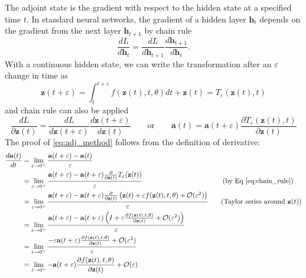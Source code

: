 \documentclass{article}
\renewcommand{\epsilon}{\varepsilon}
\newcommand\bigO{\mathcal{O}}
\newcommand{\va}{\mathbf{a}}
\newcommand{\vh}{\mathbf{h}}
\newcommand{\vz}{\mathbf{z}}
\newcommand{\hidden}{\vh}
\newcommand{\sol}{\vz}  %
\newcommand{\adj}{\va}
\begin{document}
\begin{appendices}
\noindent
The adjoint state is the gradient with respect to the hidden state at a specified time $t$. In standard neural networks, the gradient of a hidden layer $\hidden_t$ depends on the gradient from the next layer $\hidden_{t+1}$ by chain rule
\begin{equation}
\frac{d L}{d \hidden_t} = \frac{d L}{d \hidden_{t+1}} \frac{d \hidden_{t+1}}{d \hidden_{t}}.
\end{equation}
With a continuous hidden state, we can write the transformation after an $\epsilon$ change in time as
\begin{equation}
\sol(t+\epsilon) = \int_t^{t+\epsilon} f(\sol(t), t, \theta) dt + \sol(t) = T_\epsilon(\sol(t), t)
\end{equation}
and chain rule can also be applied
\begin{equation}\label{eq:chain_rule}
\frac{d L}{\partial \sol(t)} = \frac{d L}{d \sol(t+\epsilon)} \frac{d \sol(t+\epsilon)}{d \sol(t)} \quad\quad\text{or}\quad\quad \adj(t) = \adj(t+\epsilon)\frac{\partial T_\epsilon(\sol(t), t)}{\partial \sol(t)}
\end{equation}
The proof of \eqref{eq:adj_method} follows from the definition of derivative:
\begin{align}
\frac{d \adj(t)}{d t} &= \lim\limits_{\epsilon\rightarrow 0^+} \frac{\adj(t+\epsilon) - \adj(t)}{\epsilon} \\
&= \lim\limits_{\epsilon\rightarrow 0^+} \frac{\adj(t+\epsilon) - \adj(t+\epsilon)\frac{\partial }{\partial \sol(t)}T_\epsilon(\sol(t))}{\epsilon} \qquad\qquad\qquad\qquad\qquad\;\quad \;\textnormal{(by Eq \ref{eq:chain_rule})}\\
&= \lim\limits_{\epsilon\rightarrow 0^+} \frac{\adj(t+\epsilon) - \adj(t+\epsilon)\frac{\partial }{\partial \sol(t)}\left( \sol(t) + \epsilon f(\sol(t), t, \theta) + \bigO(\epsilon^2) \right)}{\epsilon} \;\;\;\quad \textnormal{(Taylor series around $\sol(t)$)}\\
&= \lim\limits_{\epsilon\rightarrow 0^+} \frac{\adj(t+\epsilon) - \adj(t+\epsilon)\left( I + \epsilon \frac{\partial f(\sol(t), t, \theta) }{\partial \sol(t)} + \bigO(\epsilon^2) \right)}{\epsilon} \\
&= \lim\limits_{\epsilon\rightarrow 0^+} \frac{ - \epsilon \adj(t+\epsilon)\frac{\partial f(\sol(t), t, \theta) }{\partial \sol(t)} + \bigO(\epsilon^2)}{\epsilon} \\
&= \lim\limits_{\epsilon\rightarrow 0^+} - \adj(t+\epsilon)\frac{\partial f(\sol(t), t, \theta)}{\partial \sol(t)} + \bigO(\epsilon) \\

\end{align}
\end{appendices}
\end{document}
